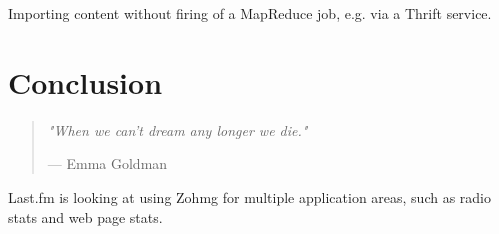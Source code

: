 \documentclass[a4paper,10pt]{book}
\newcommand{\chapterquote}[2] {
\begin{quote}
\textit{"{#1}"}

--- {#2}
\end{quote}

\vspace{24pt}
}
\begin{document}
Importing content without firing of a MapReduce job, e.g. via a Thrift
service.



\chapter{Conclusion}

\chapterquote{When we can't dream any longer we die.}{Emma Goldman}

Last.fm is looking at using Zohmg for multiple application areas, such as
radio stats and web page stats.


\pagebreak



 
\end{document}
